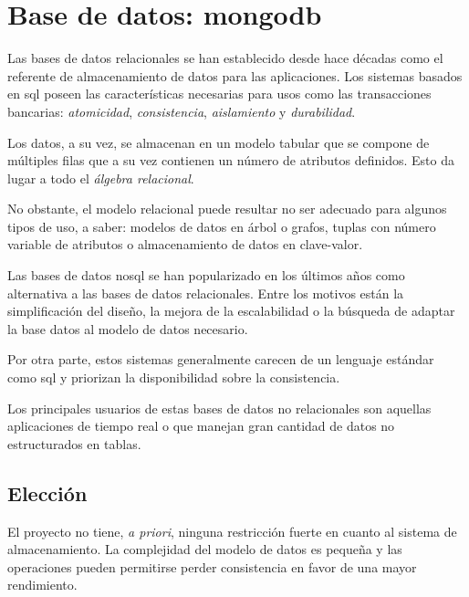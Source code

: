 \documentclass[main]{subfiles}
\begin{document}
\section[Base de datos: MongoDB]{Base de datos: \gls{mongodb}}
\label{sec:tech-mongodb}

Las bases de datos relacionales se han establecido desde hace décadas como el referente de almacenamiento de datos para las aplicaciones. Los sistemas basados en \gls{sql} poseen las características necesarias para usos como las transacciones bancarias: \emph{atomicidad}, \emph{consistencia}, \emph{aislamiento} y \emph{durabilidad}.

Los datos, a su vez, se almacenan en un modelo tabular que se compone de múltiples filas que a su vez contienen un número de atributos definidos. Esto da lugar a todo el \emph{álgebra relacional}.

No obstante, el modelo relacional puede resultar no ser adecuado para algunos tipos de uso, a saber: modelos de datos en árbol o grafos, tuplas con número variable de atributos o almacenamiento de datos en clave-valor.


Las bases de datos \gls{nosql} se han popularizado en los últimos años como alternativa a las bases de datos relacionales. Entre los motivos están la simplificación del diseño, la mejora de la escalabilidad o la búsqueda de adaptar la base datos al modelo de datos necesario.

Por otra parte, estos sistemas generalmente carecen de un lenguaje estándar como \gls{sql} y priorizan la disponibilidad sobre la consistencia.

Los principales usuarios de estas bases de datos no relacionales son aquellas aplicaciones de tiempo real o que manejan gran cantidad de datos no estructurados en tablas.

\subsection{Elección}

El proyecto no tiene, \emph{a priori}, ninguna restricción fuerte en cuanto al sistema de almacenamiento. La complejidad del modelo de datos es pequeña y las operaciones pueden permitirse perder consistencia en favor de una mayor rendimiento.
\end{document}
